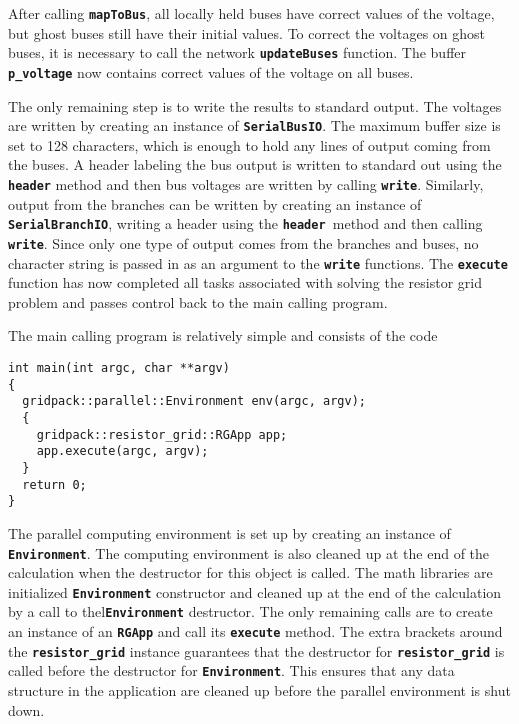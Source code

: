 After calling \texttt{\textbf{mapToBus}}, all locally held buses have correct
values of the voltage, but ghost buses still have their initial values. To
correct the voltages on ghost buses, it is necessary to call the network
\texttt{\textbf{updateBuses}} function. The buffer \texttt{\textbf{p\_voltage}}
now contains correct values of the voltage on all buses.

The only remaining step is to write the results to standard output. The voltages
are written by creating an instance of \texttt{\textbf{SerialBusIO}}. The
maximum buffer size is set to 128 characters, which is enough to hold any lines
of output coming from the buses. A header labeling the bus output is written to
standard out using the \texttt{\textbf{header}} method and then bus voltages are
written by calling \texttt{\textbf{write}}. Similarly, output from the branches
can be written by creating an instance of \texttt{\textbf{SerialBranchIO}},
writing a header using the \texttt{\textbf{header }}method and then calling
\texttt{\textbf{write}}. Since only one type of output comes from the branches
and buses, no character string is passed in as an argument to the \texttt{\textbf{write}} functions. The \texttt{\textbf{execute}} function has now completed all tasks associated with solving the resistor grid problem and passes control back to the main calling program.

The main calling program is relatively simple and consists of the code

{
\color{red}
\begin{Verbatim}[fontseries=b]
int main(int argc, char **argv)
{
  gridpack::parallel::Environment env(argc, argv);
  {
    gridpack::resistor_grid::RGApp app;
    app.execute(argc, argv);
  }
  return 0;
}
\end{Verbatim}
}

The parallel computing environment is set up by creating an instance of
\texttt{\textbf{Environment}}. The computing environment is also cleaned up at
the end of the calculation when the destructor for this object is called. The
math libraries are initialized \texttt{\textbf{Environment}} constructor and
cleaned up at the end of the calculation by a call to
thel\texttt{\textbf{Environment}} destructor. The only remaining calls are to
create an instance of an \texttt{\textbf{RGApp}} and call its
\texttt{\textbf{execute}} method. The extra brackets around the
\texttt{\textbf{resistor\_grid}} instance guarantees that the destructor for
\texttt{\textbf{resistor\_grid}} is called before the destructor for
\texttt{\textbf{Environment}}. This ensures that any data structure in the
application are cleaned up before the parallel environment is shut down.

